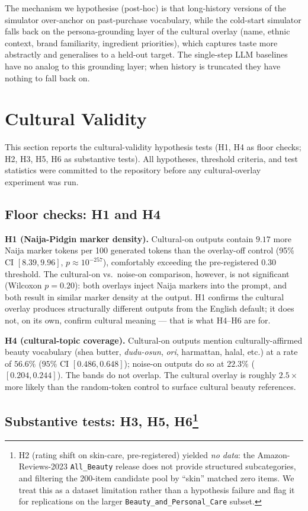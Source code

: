 \documentclass[8pt,twocolumn,a4paper]{extarticle}
\begin{document}
The mechanism we hypothesise (post-hoc) is that long-history versions of the simulator over-anchor on past-purchase vocabulary, while the cold-start simulator falls back on the persona-grounding layer of the cultural overlay (name, ethnic context, brand familiarity, ingredient priorities), which captures taste more abstractly and generalises to a held-out target. The single-step LLM baselines have no analog to this grounding layer; when history is truncated they have nothing to fall back on.

\section{Cultural Validity}
\label{sec:cultural}

This section reports the cultural-validity hypothesis tests (H1, H4 as floor checks; H2, H3, H5, H6 as substantive tests). All hypotheses, threshold criteria, and test statistics were committed to the repository before any cultural-overlay experiment was run.

\subsection{Floor checks: H1 and H4}

\textbf{H1 (Naija-Pidgin marker density).} Cultural-on outputs contain $9.17$ more Naija marker tokens per 100 generated tokens than the overlay-off control (95\% CI $[8.39, 9.96]$, $p \approx 10^{-257}$), comfortably exceeding the pre-registered $0.30$ threshold. The cultural-on vs.\ noise-on comparison, however, is not significant (Wilcoxon $p = 0.20$): both overlays inject Naija markers into the prompt, and both result in similar marker density at the output. H1 confirms the cultural overlay produces structurally different outputs from the English default; it does not, on its own, confirm cultural meaning --- that is what H4--H6 are for.

\textbf{H4 (cultural-topic coverage).} Cultural-on outputs mention culturally-affirmed beauty vocabulary (shea butter, \textit{dudu-osun}, \textit{ori}, harmattan, halal, etc.) at a rate of $56.6\%$ ($95\%$ CI $[0.486, 0.648]$); noise-on outputs do so at $22.3\%$ ($[0.204, 0.244]$). The bands do not overlap. The cultural overlay is roughly $2.5\times$ more likely than the random-token control to surface cultural beauty references. \checkmark

\subsection{Substantive tests: H3, H5, H6\protect\footnote{H2 (rating shift on skin-care, pre-registered) yielded \emph{no data}: the Amazon-Reviews-2023 \texttt{All\_Beauty} release does not provide structured subcategories, and filtering the 200-item candidate pool by ``skin'' matched zero items. We treat this as a dataset limitation rather than a hypothesis failure and flag it for replications on the larger \texttt{Beauty\_and\_Personal\_Care} subset.}}
\end{document}
